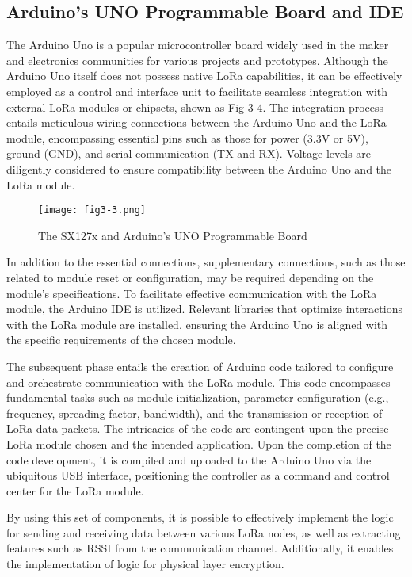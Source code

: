 \subsection{Arduino’s UNO Programmable Board and IDE}
The Arduino Uno is a popular microcontroller board widely used in the maker and electronics communities for various projects and prototypes. Although the Arduino Uno itself does not possess native LoRa capabilities, it can be effectively employed as a control and interface unit to facilitate seamless integration with external LoRa modules or chipsets, shown as Fig 3-4. The integration process entails meticulous wiring connections between the Arduino Uno and the LoRa module, encompassing essential pins such as those for power (3.3V or 5V), ground (GND), and serial communication (TX and RX). Voltage levels are diligently considered to ensure compatibility between the Arduino Uno and the LoRa module. 
\begin{figure}
  \centering
  \texttt{[image: fig3-3.png]}
  \caption{The SX127x and Arduino’s UNO Programmable Board}
  \label{fig:3-3}
\end{figure}
In addition to the essential connections, supplementary connections, such as those related to module reset or configuration, may be required depending on the module's specifications. To facilitate effective communication with the LoRa module, the Arduino IDE is utilized. Relevant libraries that optimize interactions with the LoRa module are installed, ensuring the Arduino Uno is aligned with the specific requirements of the chosen module.

The subsequent phase entails the creation of Arduino code tailored to configure and orchestrate communication with the LoRa module. This code encompasses fundamental tasks such as module initialization, parameter configuration (e.g., frequency, spreading factor, bandwidth), and the transmission or reception of LoRa data packets. The intricacies of the code are contingent upon the precise LoRa module chosen and the intended application. Upon the completion of the code development, it is compiled and uploaded to the Arduino Uno via the ubiquitous USB interface, positioning the controller as a command and control center for the LoRa module.

By using this set of components, it is possible to effectively implement the logic for sending and receiving data between various LoRa nodes, as well as extracting features such as RSSI from the communication channel. Additionally, it enables the implementation of logic for physical layer encryption.

